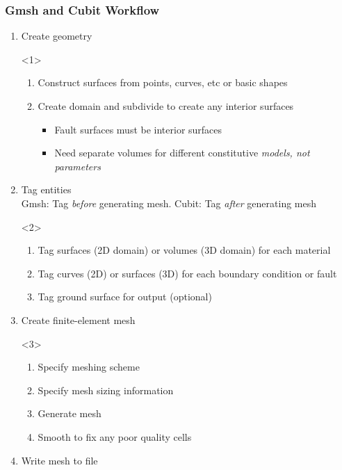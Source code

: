 \documentclass[aspectratio=169]{beamer}
\begin{document}
\begin{frame}[t]
  \frametitle{Gmsh and Cubit Workflow}
  \summary{}

  \begin{enumerate}
  \item Create geometry
    \begin{onlyenv}<1>
      \begin{enumerate}
      \item Construct surfaces from points, curves, etc or basic shapes
      \item Create domain and subdivide to create any interior surfaces
        \begin{itemize}
        \item Fault surfaces must be interior surfaces
        \item Need separate volumes for different constitutive {\em models, not parameters}
        \end{itemize}
      \end{enumerate}
    \end{onlyenv}
  \item Tag entities\\
    Gmsh: Tag {\em before} generating mesh. Cubit: Tag {\em after} generating mesh
    \begin{onlyenv}<2>
      \begin{enumerate}
      \item Tag surfaces (2D domain) or volumes (3D domain) for each material
      \item Tag curves (2D) or surfaces (3D) for each boundary condition or fault
      \item Tag ground surface for output (optional)
      \end{enumerate}
    \end{onlyenv}
  \item Create finite-element mesh
    \begin{onlyenv}<3>
      \begin{enumerate}
      \item Specify meshing scheme
      \item Specify mesh sizing information
      \item Generate mesh
      \item Smooth to fix any poor quality cells
      \end{enumerate}
    \end{onlyenv}
  \item Write mesh to file
  \end{enumerate}

\end{frame}
\end{document}

